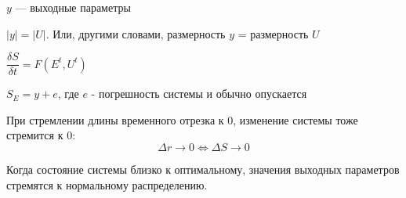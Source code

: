 \documentclass[12pt]{article}
\begin{document}
\begin{sloppypar}
    $y$ — выходные параметры

    $|y| = |U|$. Или, другими словами, размерность $y$ = размерность $U$

    $\dfrac{\delta S}{\delta t} = F(E^t, U^t)$

    $S_E = y + e$, где $e$ - погрешность системы и обычно опускается

    При стремлении длины временного отрезка к 0, изменение системы тоже стремится к 0:
    \[
        \Delta r \rightarrow 0 \Leftrightarrow \Delta S \rightarrow 0
    \]

    Когда состояние системы близко к оптимальному, значения выходных параметров стремятся к нормальному распределению.
\end{sloppypar}
\end{document}
